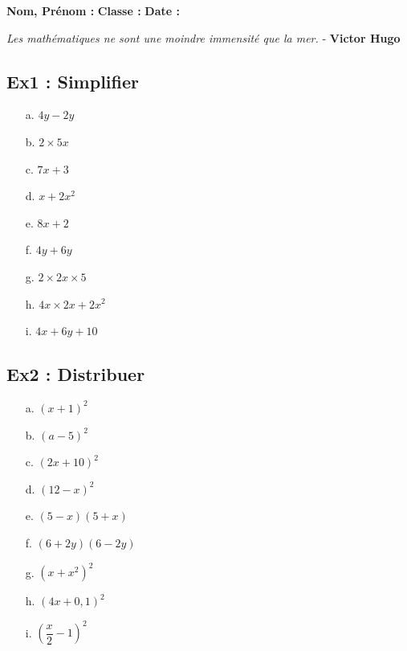 \documentclass[11pt]{article}
\newcommand{\Pointilles}[1][3]{%
  \multido{}{#1}{\makebox[\linewidth]{\dotfill}\\[\parskip]
}}
\begin{document}
\setlength{\columnseprule}{1pt}

\textbf{Nom, Prénom :} \hspace{8cm} \textbf{Classe :} \hspace{3cm} \textbf{Date :}\\
\vspace{-0.8cm}
\begin{center}
  \textit{Les mathématiques ne sont une moindre immensité que la mer.}  - \textbf{Victor Hugo}
\end{center}
\vspace{-0.8cm}

\subsection*{Ex1 : Simplifier}

\begin{multicols}{3}

\begin{enumerate}
  \item[a.] $4y - 2y$
  \item[b.] $2 \times 5 x$
  \item[c.] $7x + 3$
  \item[d.] $x + 2x^2$
  \item[e.] $8x + 2$
  \item[f.] $4y + 6y$
  \item[g.] $2 \times 2x \times 5$
  \item[h.] $4x \times 2x + 2x^2$
  \item[i.] $4x + 6y + 10$    
\end{enumerate}

\end{multicols}

 \Pointilles[8] 

 \subsection*{Ex2 : Distribuer}

\begin{multicols}{3}


\begin{enumerate}
    \item[a.] $(x+1)^2$ 
    \item[b.] $(a-5)^2$
    \item[c.] $(2x + 10)^2$
    \item[d.] $(12 - x)^2$
    \item[e.] $(5 - x)(5 + x)$   
    \item[f.] $(6 + 2y)(6 - 2y)$
    \item[g.] $(x + x^2)^2$
    \item[h.] $(4x + 0,1)^2$
    \item[i.] $(\dfrac{x}{2} - 1)^2$ 
\end{enumerate}

\end{multicols}
\end{document}

